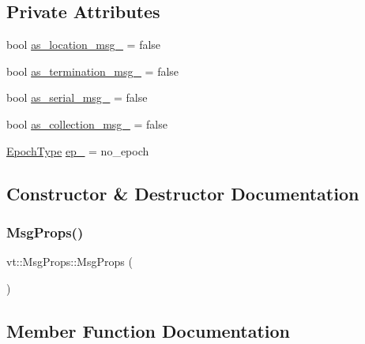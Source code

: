 \subsection*{Private Attributes}
\begin{DoxyCompactItemize}
\item 
bool \hyperlink{structvt_1_1_msg_props_a81195d9029ef87c89db0c7be410273fe}{as\+\_\+location\+\_\+msg\+\_\+} = false
\item 
bool \hyperlink{structvt_1_1_msg_props_aad3ee10c7c013e07c7d2b05930f85bdd}{as\+\_\+termination\+\_\+msg\+\_\+} = false
\item 
bool \hyperlink{structvt_1_1_msg_props_a91c1d2b64b8cf8aa6ddc2f14ae545ffb}{as\+\_\+serial\+\_\+msg\+\_\+} = false
\item 
bool \hyperlink{structvt_1_1_msg_props_a96c932077634610b92e605f617ee2a2d}{as\+\_\+collection\+\_\+msg\+\_\+} = false
\item 
\hyperlink{namespacevt_a81d11b28122d43bf9834577e4a06440f}{Epoch\+Type} \hyperlink{structvt_1_1_msg_props_a51aab5d92b3681547193b74f6449226f}{ep\+\_\+} = no\+\_\+epoch
\end{DoxyCompactItemize}


\subsection{Constructor \& Destructor Documentation}
\mbox{\label{structvt_1_1_msg_props_a3285b900d253d0dde3929bfb16ba102a}} 
\subsubsection{\texorpdfstring{Msg\+Props()}{MsgProps()}}
{\footnotesize\ttfamily vt\+::\+Msg\+Props\+::\+Msg\+Props (\begin{DoxyParamCaption}{ }\end{DoxyParamCaption})\hspace{0.3cm}{\ttfamily [default]}}



\subsection{Member Function Documentation}
\mbox{\label{structvt_1_1_msg_props_a412298bb043b186696ad457aa0a39422}} 
